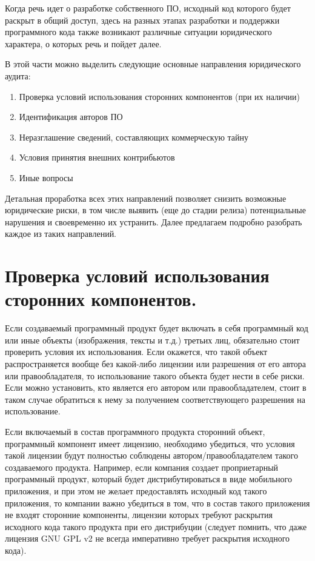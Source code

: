 \documentclass[10pt, a5paper]{article}
\begin{document}
Когда речь идет о разработке собственного ПО, исходный код которого будет раскрыт в общий доступ, здесь на разных этапах разработки и поддержки программного кода также возникают различные ситуации юридического характера, о которых речь и пойдет далее.

В этой части можно выделить следующие основные направления юридического аудита:

\begin{enumerate}
  \item Проверка условий использования сторонних компонентов (при их наличии)
  \item Идентификация авторов ПО
  \item Неразглашение сведений, составляющих коммерческую тайну
  \item Условия принятия внешних контрибьютов
  \item Иные вопросы
\end{enumerate}

Детальная проработка всех этих направлений позволяет снизить возможные юридические риски, в том числе выявить (еще до стадии релиза) потенциальные нарушения и своевременно их устранить. Далее предлагаем подробно разобрать каждое из таких направлений.

\section*{Проверка условий использования сторонних компонентов.} 
Если создаваемый программный продукт будет включать в себя программный код или иные объекты (изображения, тексты и т.д.) третьих лиц, обязательно стоит проверить условия их использования. Если окажется, что такой объект распространяется вообще без какой-либо лицензии или разрешения от его автора или правообладателя, то использование такого объекта будет нести в себе риски. Если можно установить, кто является его автором или правообладателем, стоит в таком случае обратиться к нему за получением соответствующего разрешения на использование.

Если включаемый в состав программного продукта сторонний объект, программный компонент имеет лицензию, необходимо убедиться, что условия такой лицензии будут полностью соблюдены автором/правообладателем такого создаваемого продукта. Например, если компания создает проприетарный программный продукт, который будет дистрибутироваться в виде мобильного приложения, и при этом не желает предоставлять исходный код такого приложения, то компании важно убедиться в том, что в состав такого приложения не входят сторонние компоненты, лицензии которых требуют раскрытия исходного кода такого продукта при его дистрибуции (следует помнить, что даже лицензия GNU GPL v2 не всегда императивно требует раскрытия исходного кода).
\end{document}
